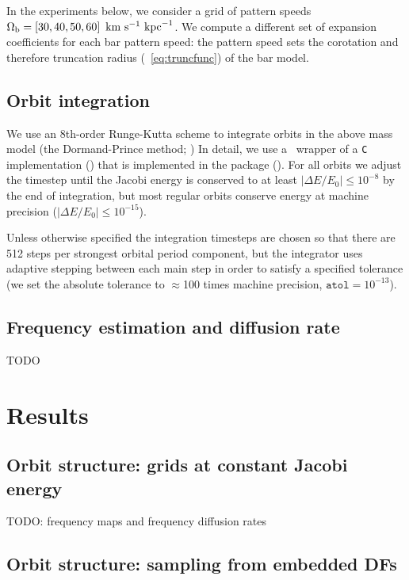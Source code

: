\documentclass[modern]{aastex61}
\begin{document}
In the experiments below, we consider a grid of pattern speeds $\Omega_{\rm b} =
\left[ 30, 40, 50, 60 \right]~\mathrm{km}~\mathrm{s}^{-1}~\mathrm{kpc}^{-1}$.
We compute a different set of expansion coefficients for each bar pattern speed:
the pattern speed sets the corotation and therefore truncation radius
(\eqname~\ref{eq:truncfunc}) of the bar model.

\subsection{Orbit integration} \label{sec:orbit-int}

We use an 8th-order Runge-Kutta scheme to integrate orbits in the above mass
model (the Dormand-Prince method; \citealt{Dormand:1980})
In detail, we use a \python\ wrapper of a \texttt{C} implementation
(\citealt{Hairer:1993}) that is implemented in the  package
(\citealt{Gala}).
For all orbits we adjust the timestep until the Jacobi energy is conserved to at
least $|\Delta E/E_0| \leq 10^{-8}$ by the end of integration, but most regular
orbits conserve energy at machine precision ($|\Delta E/E_0| \leq 10^{-15}$).

Unless otherwise specified the integration timesteps are
chosen so that there are 512 steps per strongest orbital period component, but
the integrator uses adaptive stepping between each main step in order to satisfy
a specified tolerance (we set the absolute tolerance to $\approx$100 times
machine precision, $\texttt{atol} = 10^{-13}$).

\subsection{Frequency estimation and diffusion rate} \label{sec:freqdiff}

TODO

\section{Results} \label{sec:results}

\subsection{Orbit structure: grids at constant Jacobi energy}

TODO: frequency maps and frequency diffusion rates

\subsection{Orbit structure: sampling from embedded DFs}
\end{document}
